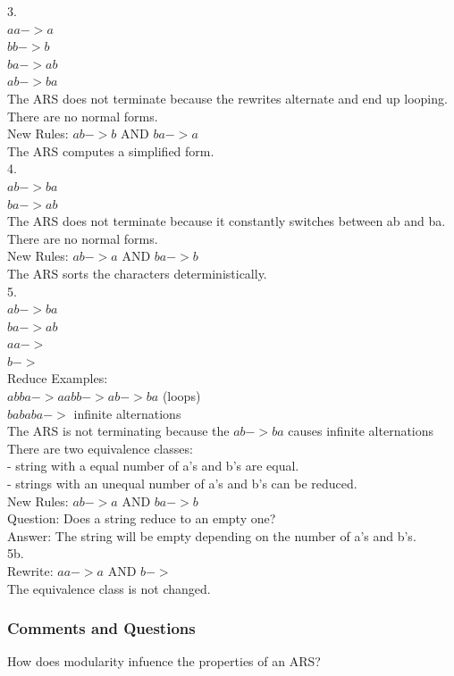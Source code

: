 \documentclass{article}
\theoremstyle{theorem}
\theoremstyle{definition}
\theoremstyle{remark}
\begin{document}
3.\\
$aa -> a$\\
$bb -> b$\\
$ba -> ab$\\
$ab -> ba$\\
The ARS does not terminate because the rewrites alternate and end up looping. \\
There are no normal forms. \\
New Rules: $ab -> b$ AND $ba -> a$\\
The ARS computes a simplified form. \\
4.\\
$ab -> ba$ \\
$ba -> ab$\\
The ARS does not terminate because it constantly switches between ab and ba.\\
There are no normal forms. \\
New Rules: $ab -> a$ AND $ba -> b$ \\
The ARS sorts the characters deterministically.  \\
5.\\
$ab -> ba$\\
$ba -> ab$\\
$aa ->$\\
$b ->$ \\
Reduce Examples: \\
$abba -> aabb -> ab -> ba$ (loops)\\
$bababa ->$ infinite alternations \\
The ARS is not terminating because the $ab -> ba$ causes infinite alternations \\
There are two equivalence classes: \\
- string with a equal number of a's and b's are equal. \\
- strings with an unequal number of a's and b's can be reduced. \\
New Rules: $ab -> a$ AND $ba -> b$ \\
Question: Does a string reduce to an empty one?  \\
Answer: The string will be empty depending on the number of a's and b's. \\
5b. \\
Rewrite: $aa -> a$ AND $b ->$ \\
The equivalence class is not changed. \\

\subsubsection*{Comments and Questions}
How does modularity infuence the properties of an ARS? \\
\end{document}

